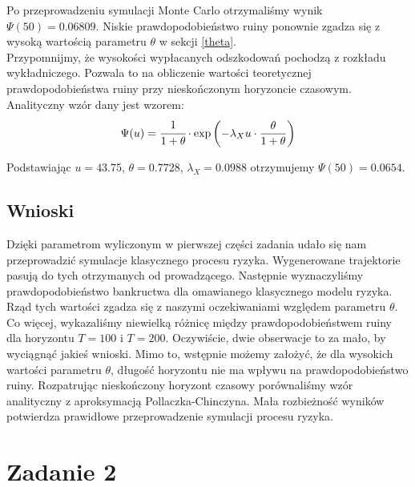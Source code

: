 \documentclass[12pt]{mwart}
\begin{document}
	\noindent Po przeprowadzeniu symulacji Monte Carlo otrzymaliśmy wynik $\Psi (50)=0.06809$. Niskie prawdopodobieństwo ruiny ponownie zgadza się z wysoką wartością parametru $\theta$ w sekcji \ref{theta}. \\
	
	\noindent Przypomnijmy, że wysokości wypłacanych odszkodowań pochodzą z rozkładu wykładniczego. Pozwala to na obliczenie wartości teoretycznej prawdopodobieństwa ruiny przy nieskończonym horyzoncie czasowym. Analityczny wzór dany jest wzorem:
	$$\Psi (u)=\cfrac{1}{1+\theta} \cdot \exp \left( -\lambda_X u \cdot \frac{\theta}{1+\theta} \right) 
	$$
	
	\noindent Podstawiając $u=43.75$, $\theta=0.7728$, $\lambda_X=0.0988$ otrzymujemy $\Psi (50)=0.0654$.
	
	\subsection{Wnioski}
	\noindent Dzięki parametrom wyliczonym w pierwszej części zadania udało się nam przeprowadzić symulacje klasycznego procesu ryzyka. Wygenerowane trajektorie pasują do tych otrzymanych od prowadzącego. Następnie wyznaczyliśmy prawdopodobieństwo bankructwa dla omawianego klasycznego modelu ryzyka. Rząd tych wartości zgadza się z naszymi oczekiwaniami względem parametru $\theta$. Co więcej, wykazaliśmy niewielką różnicę między prawdopodobieństwem ruiny dla horyzontu $T=100$ i $T=200$. Oczywiście, dwie obserwacje to za mało, by wyciągnąć jakieś wnioski. Mimo to, wstępnie możemy założyć, że dla wysokich wartości parametru $\theta$, długość horyzontu nie ma wpływu na prawdopodobieństwo ruiny. Rozpatrując nieskończony horyzont czasowy porównaliśmy wzór analityczny z aproksymacją Pollaczka-Chinczyna. Mała rozbieżność wyników potwierdza prawidłowe przeprowadzenie symulacji procesu ryzyka.
	
	
	\section{Zadanie 2}
\end{document}
